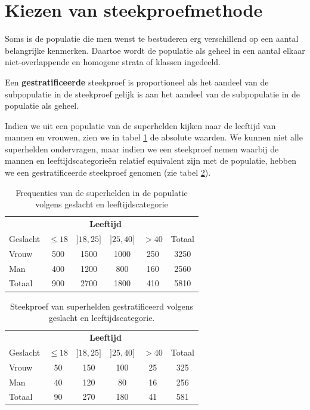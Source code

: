 \section{Kiezen van steekproefmethode}
  Soms is de populatie die men wenst te bestuderen erg verschillend op een aantal belangrijke kenmerken. Daartoe wordt de populatie als geheel in een aantal elkaar niet-overlappende en homogene strata of klassen ingedeeld.

\begin{definition}
Een \textbf{gestratificeerde}  steekproef is proportioneel als het aandeel van de subpopulatie in de steekproef gelijk is aan het aandeel van de subpopulatie in de populatie als geheel.
\end{definition}

\begin{example}
  Indien we uit een populatie van de superhelden kijken naar de leeftijd van  mannen en vrouwen, zien we in tabel \ref{tab:heldenPopulatie1} de absolute waarden. We kunnen niet alle superhelden ondervragen, maar indien we een steekproef nemen waarbij de mannen en leeftijdscategorie\"en relatief equivalent zijn met de populatie, hebben we een gestratificeerde steekproef genomen (zie tabel \ref{tab:heldenPopulatie2}).
\end{example}

  \begin{table}[h]
  \centering
    \begin{tabular}{l|cccc|c}
      & \multicolumn{4}{c|}{\textbf{Leeftijd}} & \\
      Geslacht & $\le 18$ & $]18,25]$ & $]25, 40]$ & $> 40$ & Totaal\\
      \hline
      Vrouw & 500 & 1500 & 1000 & 250 & 3250 \\
      Man   & 400 & 1200 & 800 & 160 & 2560\\
      \hline
      Totaal & 900 & 2700 & 1800 & 410 & 5810
    \end{tabular}
    \caption{Frequenties van de superhelden in de populatie volgens geslacht en leeftijdscategorie}
    \label{tab:heldenPopulatie1}
\end{table}

\begin{table}[h]
  \centering
    \begin{tabular}{l|cccc|c}
      & \multicolumn{4}{c|}{\textbf{Leeftijd}} & \\
      Geslacht & $\le 18$ & $]18,25]$ & $]25, 40]$ & $> 40$ & Totaal\\
      \hline
      Vrouw & 50 & 150 & 100 & 25 & 325 \\
      Man   & 40 & 120 & 80 & 16 & 256\\
      \hline
      Totaal & 90 & 270 & 180 & 41 & 581
    \end{tabular}
      \caption{Steekproef van superhelden gestratificeerd volgens geslacht en leeftijdscategorie.}
    \label{tab:heldenPopulatie2}
  \end{table}




